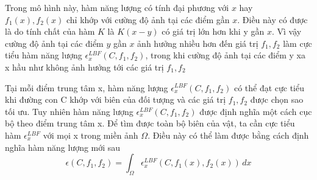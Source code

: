 \documentclass[12pt,oneside,a4]{report}
\begin{document}
Trong mô hình này, hàm năng lượng có tính đại phương với $x$ hay $f_1(x), f_2(x)$  chỉ khớp với cường độ ảnh tại các điểm gần $x$. Điều này có được là do tính chất của hàm $K$ là $K(x-y)$ có giá trị lớn hơn khi y gần $x$. Vì vậy cường độ ảnh tại các điểm $y$ gần $x$ ảnh hưởng nhiều hơn đến giá trị $f_1, f_2$ làm cực tiểu hàm năng lượng $\epsilon_x^{LBF}(C,f_1, f_2)$, trong khi cường độ ảnh tại các điểm y xa x hầu như không ảnh hưởng tới các giá trị $f_1, f_2$

Tại mỗi điểm trung tâm x, hàm năng lượng $\epsilon_x^{LBF}(C,f_1, f_2)$   có thể đạt cực tiểu khi đường con C khớp với biên của đối tượng và các giá trị $f_1, f_2$ được chọn sao tối ưu. Tuy nhiên hàm năng lượng $\epsilon_x^{LBF}(C,f_1, f_2)$ được định nghĩa một cách cục bộ theo điểm trung tâm x. Để tìm được toàn bộ biên của vật, ta cần cực tiểu hàm $\epsilon_x^{LBF}$  với mọi x trong miền ảnh $\Omega$. Điều này có thể làm được bằng cách định nghĩa hàm năng lượng mới sau
\begin{equation}
\epsilon(C, f_1, f_2)=\int_{\Omega} \epsilon_x^{LBF}(C, f_1(x), f_2(x))\,dx
\end{equation}
\end{document}
